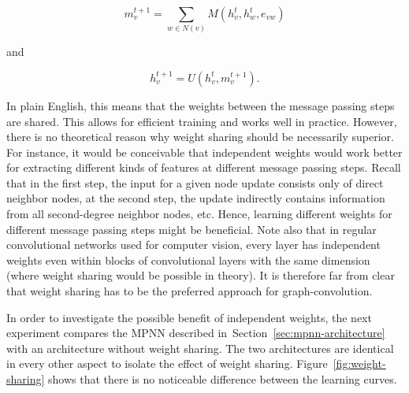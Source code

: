 \begin{equation}\label{eq:message-function-shared}
m_v^{t+1} = \sum_{w \in N(v)} M(h_v^t, h_w^t, e_{vw})
\end{equation}

and

\begin{equation}\label{eq:update-function-shared}
h_v^{t+1} = U(h_v^t, m_v^{t+1}).
\end{equation}

In plain English, this means that the weights between the message passing steps are shared. This allows for efficient training and works well in practice. However, there is no theoretical reason why weight sharing should be necessarily superior. For instance, it would be conceivable that independent weights would work better for extracting different kinds of features at different message passing steps. Recall that in the first step, the input for a given node update consists only of direct neighbor nodes, at the second step, the update indirectly contains information from all second-degree neighbor nodes, etc. Hence, learning different weights for different message passing steps might be beneficial. Note also that in regular convolutional networks used for computer vision, every layer has independent weights even within blocks of convolutional layers with the same dimension (where weight sharing would be possible in theory). It is therefore far from clear that weight sharing has to be the preferred approach for graph-convolution.

In order to investigate the possible benefit of independent weights, the next experiment compares the MPNN described in~Section~\ref{sec:mpnn-architecture} with an architecture without weight sharing. The two architectures are identical in every other aspect to isolate the effect of weight sharing. Figure~\ref{fig:weight-sharing} shows that there is no noticeable difference between the learning curves.


